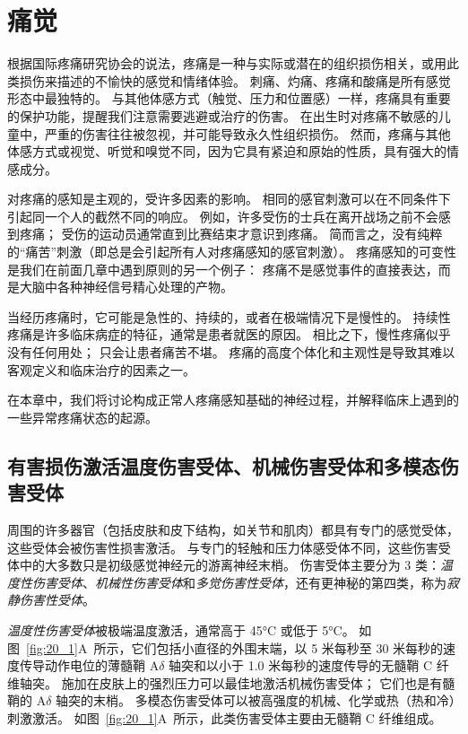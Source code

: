\chapter{痛觉} \label{chap:chap20}

根据国际疼痛研究协会的说法，疼痛是一种与实际或潜在的组织损伤相关，或用此类损伤来描述的不愉快的感觉和情绪体验。
刺痛、灼痛、疼痛和酸痛是所有感觉形态中最独特的。
与其他体感方式（触觉、压力和位置感）一样，疼痛具有重要的保护功能，提醒我们注意需要逃避或治疗的伤害。 
在出生时对疼痛不敏感的儿童中，严重的伤害往往被忽视，并可能导致永久性组织损伤。
然而，疼痛与其他体感方式或视觉、听觉和嗅觉不同，因为它具有紧迫和原始的性质，具有强大的情感成分。



对疼痛的感知是主观的，受许多因素的影响。
相同的感官刺激可以在不同条件下引起同一个人的截然不同的响应。
例如，许多受伤的士兵在离开战场之前不会感到疼痛；
受伤的运动员通常直到比赛结束才意识到疼痛。
简而言之，没有纯粹的“痛苦”刺激（即总是会引起所有人对疼痛感知的感官刺激）。
疼痛感知的可变性是我们在前面几章中遇到原则的另一个例子：
疼痛不是感觉事件的直接表达，而是大脑中各种神经信号精心处理的产物。


当经历疼痛时，它可能是急性的、持续的，或者在极端情况下是慢性的。
持续性疼痛是许多临床病症的特征，通常是患者就医的原因。
相比之下，慢性疼痛似乎没有任何用处；
只会让患者痛苦不堪。
疼痛的高度个体化和主观性是导致其难以客观定义和临床治疗的因素之一。


在本章中，我们将讨论构成正常人疼痛感知基础的神经过程，并解释临床上遇到的一些异常疼痛状态的起源。



\section{有害损伤激活温度伤害受体、机械伤害受体和多模态伤害受体}

周围的许多器官（包括皮肤和皮下结构，如关节和肌肉）都具有专门的感觉受体，这些受体会被伤害性损害激活。
与专门的轻触和压力体感受体不同，这些伤害受体中的大多数只是初级感觉神经元的游离神经末梢。
伤害受体主要分为 3 类：\textit{温度性伤害受体}、\textit{机械性伤害受体}和\textit{多觉伤害性受体}，还有更神秘的第四类，称为\textit{寂静伤害性受体}。


\textit{温度性伤害受体}被极端温度激活，通常高于 45°C 或低于 5°C。
如图~\ref{fig:20_1}A~所示，它们包括小直径的外围末端，以 5 米每秒至 30 米每秒的速度传导动作电位的薄髓鞘 A$\delta$ 轴突和以小于 1.0 米每秒的速度传导的无髓鞘 C 纤维轴突。
施加在皮肤上的强烈压力可以最佳地激活机械伤害受体；
它们也是有髓鞘的 A$\delta$ 轴突的末梢。
多模态伤害受体可以被高强度的机械、化学或热（热和冷）刺激激活。
如图~\ref{fig:20_1}A~所示，此类伤害受体主要由无髓鞘 C 纤维组成。


